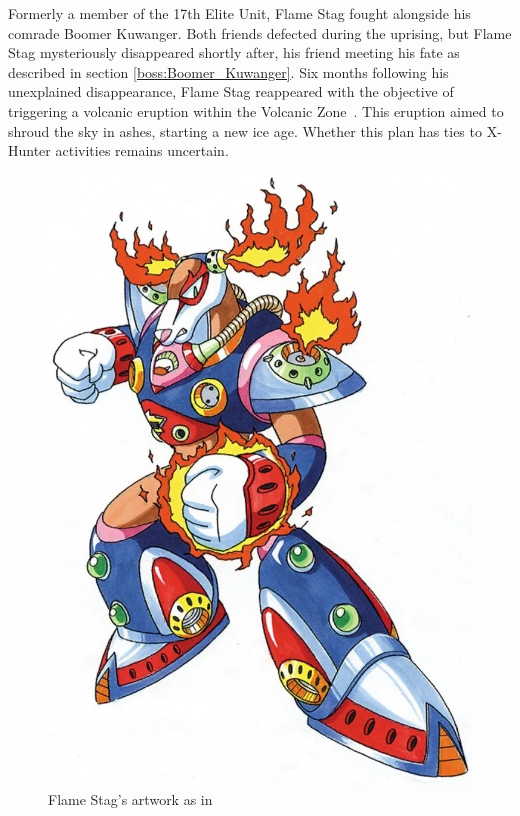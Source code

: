 Formerly a member of the 17th Elite Unit, Flame Stag fought alongside his comrade Boomer Kuwanger. Both friends defected during the uprising, but Flame Stag mysteriously disappeared shortly after, his friend meeting his fate as described in section \ref{boss:Boomer_Kuwanger}. Six months following his unexplained disappearance, Flame Stag reappeared with the objective of triggering a volcanic eruption within the Volcanic Zone~\cite{wayback:X2_resources,wiki:Flame_stag}. This eruption aimed to shroud the sky in ashes, starting a new ice age. Whether this plan has ties to X-Hunter activities remains uncertain.
\begin{figure}[htp]
	\centering
	\includegraphics[height=\portraitsize]{figures/X2/Flame_stag/Flame_Stag.png}
	\caption{Flame Stag's artwork as in \cite{book:MMX_Complete_art}}
\end{figure}
